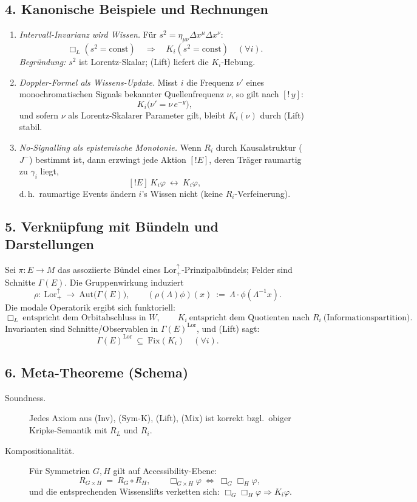 \documentclass[10pt, letterpaper]{article}
\begin{document}
\subsection*{4. Kanonische Beispiele und Rechnungen}
\begin{enumerate}
\item \emph{Intervall-Invarianz wird Wissen.} Für $s^2=\eta_{\mu\nu}\Delta x^\mu\Delta x^\nu$:
\[
\Box_L(s^2=\text{const})\quad\Rightarrow\quad K_i(s^2=\text{const})\quad(\forall i).
\]
\emph{Begründung:} $s^2$ ist Lorentz-Skalar; (Lift) liefert die $K_i$-Hebung.

\item \emph{Doppler-Formel als Wissens-Update.} Misst $i$ die Frequenz $\nu'$ eines monochromatischen Signals bekannter Quellenfrequenz $\nu$, so gilt nach $[!\,y]$:
\[
K_i\Big(\nu'=\nu\,e^{-y}\Big),
\]
und sofern $\nu$ als Lorentz-Skalarer Parameter gilt, bleibt $K_i(\nu)$ durch (Lift) stabil.

\item \emph{No-Signalling als epistemische Monotonie.} Wenn $R_i$ durch Kausalstruktur ($J^-$) bestimmt ist, dann erzwingt jede Aktion $[!E]$, deren Träger raumartig zu $\gamma_i$ liegt, 
\[
[!E]\ K_i\varphi\ \leftrightarrow\ K_i\varphi,
\]
d.\,h.\ raumartige Events ändern $i$'s Wissen nicht (keine $R_i$-Verfeinerung).
\end{enumerate}

\subsection*{5. Verknüpfung mit Bündeln und Darstellungen}
Sei $\pi:E\to M$ das assoziierte Bündel eines $\mathrm{Lor}^\uparrow_+$-Prinzipalbündels; Felder sind Schnitte $\Gamma(E)$. Die Gruppenwirkung induziert
\[
\rho:\ \mathrm{Lor}^\uparrow_+\ \longrightarrow\ \mathrm{Aut}\big(\Gamma(E)\big),\qquad 
(\rho(\Lambda)\phi)(x)\ :=\ \Lambda\cdot \phi(\Lambda^{-1}x).
\]
Die modale Operatorik ergibt sich funktoriell:
\[
\Box_L\ \text{entspricht dem Orbitabschluss in }W,\qquad
K_i\ \text{entspricht dem Quotienten nach }R_i\ \text{(Informationspartition)}.
\]
Invarianten sind Schnitte/Observablen in $\Gamma(E)^{\mathrm{Lor}}$, und (Lift) sagt:
\[
\Gamma(E)^{\mathrm{Lor}}\ \subseteq\ \text{Fix}(K_i)\quad(\forall i).
\]

\subsection*{6. Meta-Theoreme (Schema)}
\begin{description}
\item[Soundness.] Jedes Axiom aus (Inv), (Sym-K), (Lift), (Mix) ist korrekt bzgl.\ obiger Kripke-Semantik mit $R_L$ und $R_i$.
\item[Kompositionalität.] Für Symmetrien $G,H$ gilt auf Accessibility-Ebene:
\[
R_{G\times H}\ =\ R_G\circ R_H,\qquad
\Box_{G\times H}\varphi\ \Longleftrightarrow\ \Box_G\Box_H\varphi,
\]
und die entsprechenden Wissenslifts verketten sich: $\Box_G\Box_H\varphi\Rightarrow K_i\varphi$.
\end{description}
\end{document}
